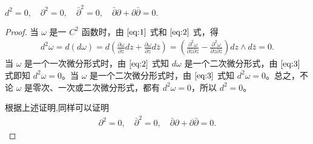 \documentclass[../../main.tex]{subfiles}
\begin{document}
\begin{proposition}
$d^2 = 0 , \quad\partial^2 = 0, \quad
\bar{\partial}^2 = 0, \quad
\bar{\partial}\partial + \partial\bar{\partial} = 0.$
\end{proposition}
\begin{proof}
当 \( \omega \) 是一 \( C^2 \) 函数时，由 \(\eqref{eq:1}\) 式和 \(\eqref{eq:2}\) 式，得
\begin{align*}
d^2\omega = d(d\omega) = d\left( \frac{\partial \omega}{\partial z}dz + \frac{\partial \omega}{\partial \bar{z}}d\bar{z} \right) = \left( \frac{\partial^2 \omega}{\partial \bar{z}\partial z} - \frac{\partial^2 \omega}{\partial z\partial \bar{z}} \right) dz \wedge d\bar{z} = 0. 
\end{align*}
当 \( \omega \) 是一个一次微分形式时，由 \(\eqref{eq:2}\) 式知 \( d\omega \) 是一个二次微分形式，由 \(\eqref{eq:3}\) 式即知 \( d^2\omega = 0 \)。当 \( \omega \) 是一个二次微分形式时，由 \(\eqref{eq:3}\) 式知 \( d^2\omega = 0 \)。总之，不论 \( \omega \) 是零次、一次或二次微分形式，都有 \( d^2\omega = 0 \)，所以 \( d^2 = 0 \)。

根据上述证明,同样可以证明
\begin{align*}
\partial^2 = 0, \quad
\bar{\partial}^2 = 0, \quad
\bar{\partial}\partial + \partial\bar{\partial} = 0. 
\end{align*}
\end{proof}
\end{document}
